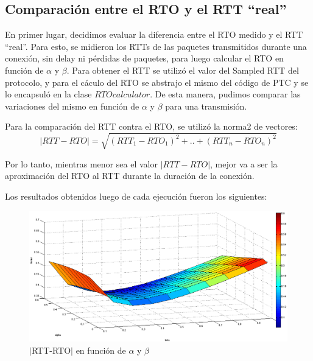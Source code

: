 \documentclass[10pt, a4paper]{article}
\begin{document}
\newpage
\subsection{Comparación entre el RTO y el RTT ``real''}

En primer lugar, decidimos evaluar la diferencia entre el RTO medido y el RTT ``real''. 
Para esto, se midieron los RTTs de las paquetes transmitidos durante una conexión, sin delay ni pérdidas de paquetes, para luego calcular el RTO en función de $\alpha$ y $\beta$.
Para obtener el RTT se utilizó el valor del Sampled RTT del protocolo, y para el cáculo del RTO se abstrajo el mismo del código de PTC y se lo encapsuló en la clase $RTOcalculator$. De esta manera, pudimos comparar las variaciones del mismo en función de $\alpha$ y $\beta$ para una transmisión.

Para la comparación del RTT contra el RTO, se utilizó la norma2 de vectores:
$$ |RTT-RTO| = \sqrt{(RTT_1-RTO_1)^2+..+(RTT_n-RTO_n)^2} $$

Por lo tanto, mientras menor sea el valor $|RTT-RTO|$, mejor va a ser la aproximación del RTO al RTT durante la duración de la conexión. 

Los resultados obtenidos luego de cada ejecución fueron los siguientes:

\begin{figure}[H]
\begin{center}
\includegraphics[width=17cm]{alphaBetaCorteCostado.png}
\caption{$|$RTT-RTO$|$ en función de $\alpha$ y $\beta$}
\end{center}
\end{figure}
\end{document}
